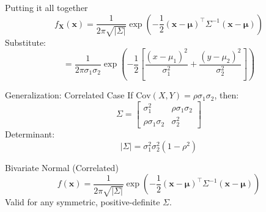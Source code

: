 \documentclass{beamer}
\begin{document}
\begin{frame}{Putting it all together}
\[
f_{\bm{X}}(\bm{x}) = \frac{1}{2\pi \sqrt{|\Sigma|}} 
\exp\left( -\frac{1}{2} (\bm{x} - \bm{\mu})^\top \Sigma^{-1} (\bm{x} - \bm{\mu}) \right)
\]
Substitute:
\[
= \frac{1}{2\pi \sigma_1 \sigma_2} 
\exp\left( -\frac{1}{2} 
\left[ 
\frac{(x - \mu_1)^2}{\sigma_1^2} + \frac{(y - \mu_2)^2}{\sigma_2^2} 
\right] \right)
\]
\end{frame}

\begin{frame}{Generalization: Correlated Case}
If \( \text{Cov}(X, Y) = \rho \sigma_1 \sigma_2 \), then:
\[
\Sigma = \begin{bmatrix}
\sigma_1^2 & \rho \sigma_1 \sigma_2 \\
\rho \sigma_1 \sigma_2 & \sigma_2^2
\end{bmatrix}
\]
Determinant:
\[
|\Sigma| = \sigma_1^2 \sigma_2^2 (1 - \rho^2)
\]
\end{frame}

\begin{frame}{Bivariate Normal (Correlated)}
\[
f(\bm{x}) = \frac{1}{2\pi \sqrt{|\Sigma|}} 
\exp\left( 
- \frac{1}{2} (\bm{x} - \bm{\mu})^\top \Sigma^{-1} (\bm{x} - \bm{\mu})
\right)
\]
Valid for any symmetric, positive-definite \( \Sigma \).
\end{frame}
\end{document}
